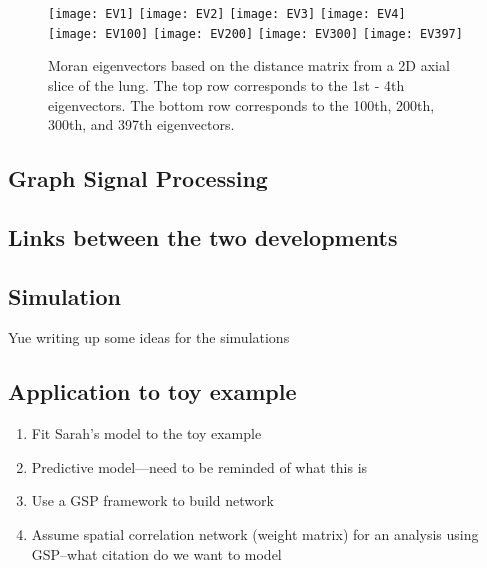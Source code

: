 \documentclass[12pt]{article}
\begin{document}


\begin{figure}
\centering 
\texttt{[image: EV1]}
\texttt{[image: EV2]}
\texttt{[image: EV3]}
\texttt{[image: EV4]}\\ 

\texttt{[image: EV100]}
\texttt{[image: EV200]}
\texttt{[image: EV300]}
\texttt{[image: EV397]}  
\caption{Moran eigenvectors based on the distance matrix from a 2D axial slice of the lung. The top row corresponds to the 1st - 4th eigenvectors. The bottom row corresponds to the 100th, 200th, 300th, and 397th eigenvectors. }
\label{fig:eigenvectors}
\end{figure}

\subsection{Graph Signal Processing}

\subsection{Links between the two developments}

\subsection{Simulation}
Yue writing up some ideas for the simulations

\subsection{Application to toy example}
\begin{enumerate}
\item{Fit Sarah's model to the toy example}
\item{Predictive model---need to be reminded of what this is}
\item{Use a GSP framework to build network}
\item{Assume spatial correlation network (weight matrix) for an analysis using GSP--what citation do we want to model}
\end{enumerate}
\end{document}
